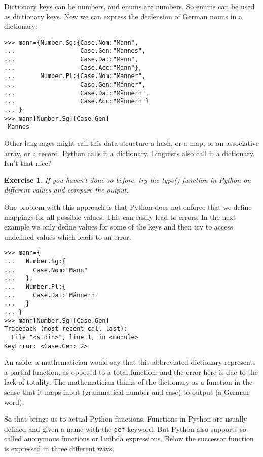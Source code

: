 \documentclass{scrartcl}
\newtheorem{exercise}{Exercise}
\begin{document}
Dictionary keys can be numbers, and enums are numbers. So enums can be used as dictionary keys. Now we can express the declension of German nouns in a dictionary:

\begin{verbatim}
>>> mann={Number.Sg:{Case.Nom:"Mann", 
...                  Case.Gen:"Mannes", 
...                  Case.Dat:"Mann", 
...                  Case.Acc:"Mann"},
...       Number.Pl:{Case.Nom:"Männer", 
...                  Case.Gen:"Männer", 
...                  Case.Dat:"Männern", 
...                  Case.Acc:"Männern"}
... }
>>> mann[Number.Sg][Case.Gen]
'Mannes'
\end{verbatim}

Other languages might call this data structure a hash, or a map, or an associative array, or a record. Python calls it a dictionary. Linguists also call it a dictionary. Isn't that nice?

\begin{exercise}
  If you haven't done so before, try the type() function in Python on different values and compare the output. 
\end{exercise}

One problem with this approach is that Python does not enforce that we define mappings for all possible values. This can easily lead to errors. In the next example we only define values for some of the keys and then try to access undefined values which leads to an error.

\begin{verbatim}
>>> mann={
...   Number.Sg:{
...     Case.Nom:"Mann"
...   },
...   Number.Pl:{
...     Case.Dat:"Männern"
...   }
... }
>>> mann[Number.Sg][Case.Gen]
Traceback (most recent call last):
  File "<stdin>", line 1, in <module>
KeyError: <Case.Gen: 2>
\end{verbatim}

An aside: a mathematician would say that this abbreviated dictionary represents a partial function, as opposed to a total function, and the error here is due to the lack of totality. The mathematician thinks of the dictionary as a function in the sense that it maps input (grammatical number and case) to output (a German word).

So that brings us to actual Python functions. Functions in Python are usually defined and given a name with the \texttt{def} keyword. But Python also supports so-called anonymous functions or lambda expressions. Below the successor function is expressed in three different ways.
\end{document}
